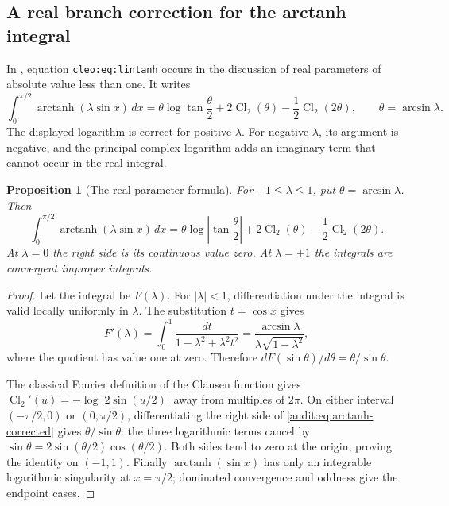 \documentclass[11pt,letterpaper]{article}
\numberwithin{equation}{section}
\theoremstyle{plain}
\newtheorem{proposition}[theorem]{Proposition}
\theoremstyle{definition}
\theoremstyle{remark}
\begin{document}
\subsection{A real branch correction for the arctanh integral}

In , equation
\texttt{cleo:eq:lintanh} occurs in the discussion of real parameters of
absolute value less than one.  It writes
\[
 \int_0^{\pi/2}\operatorname{arctanh}(\lambda\sin x)\,dx
 =\theta\log\tan\frac\theta2
       +2\operatorname{Cl}_2(\theta)
       -\frac12\operatorname{Cl}_2(2\theta),
 \qquad \theta=\arcsin\lambda.
\]
The displayed logarithm is correct for positive $\lambda$.  For negative
$\lambda$, its argument is negative, and the principal complex logarithm
adds an imaginary term that cannot occur in the real integral.

\begin{proposition}[The real-parameter formula]
\label{audit:prop:arctanh}
For $-1\le\lambda\le1$, put $\theta=\arcsin\lambda$.  Then
\begin{equation}
 \int_0^{\pi/2}\operatorname{arctanh}(\lambda\sin x)\,dx
 =\theta\log\left|\tan\frac\theta2\right|
       +2\operatorname{Cl}_2(\theta)
       -\frac12\operatorname{Cl}_2(2\theta).
 \label{audit:eq:arctanh-corrected}
\end{equation}
At $\lambda=0$ the right side is its continuous value zero.  At
$\lambda=\pm1$ the integrals are convergent improper integrals.
\end{proposition}

\begin{proof}
Let the integral be $F(\lambda)$.  For $|\lambda|<1$, differentiation
under the integral is valid locally uniformly in $\lambda$.  The
substitution $t=\cos x$ gives
\[
 F'(\lambda)=\int_0^1
       \frac{dt}{1-\lambda^2+\lambda^2t^2}
 =\frac{\arcsin\lambda}{\lambda\sqrt{1-\lambda^2}},
\]
where the quotient has value one at zero.  Therefore
$dF(\sin\theta)/d\theta=\theta/\sin\theta$.

The classical Fourier definition of the Clausen function gives
$\operatorname{Cl}_2'(u)=-\log|2\sin(u/2)|$ away from multiples
of $2\pi$.  On either interval $(-\pi/2,0)$ or $(0,\pi/2)$,
differentiating the right side of \eqref{audit:eq:arctanh-corrected}
gives $\theta/\sin\theta$: the three logarithmic terms cancel by
$\sin\theta=2\sin(\theta/2)\cos(\theta/2)$.
Both sides tend to zero at the origin, proving the identity on
$(-1,1)$.  Finally $\operatorname{arctanh}(\sin x)$ has only an
integrable logarithmic singularity at $x=\pi/2$; dominated convergence
and oddness give the endpoint cases.
\end{proof}
\end{document}
